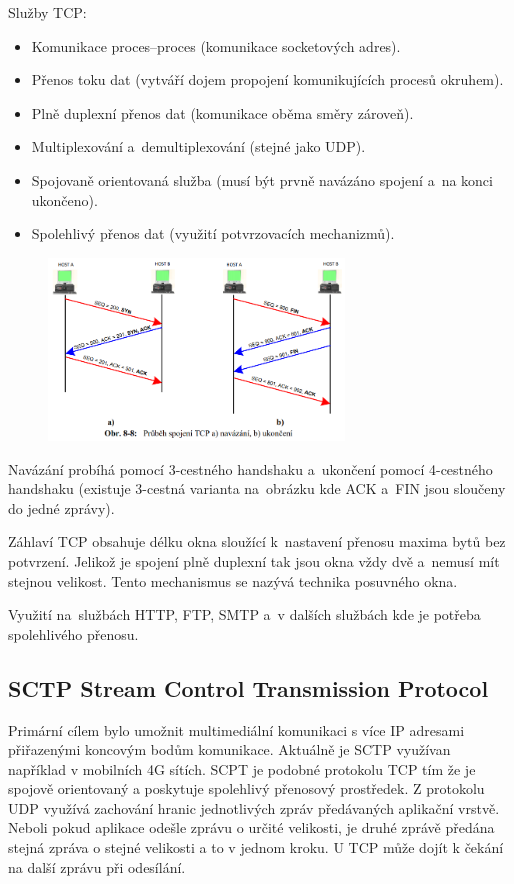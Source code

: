 Služby TCP:
\begin{itemize}[noitemsep]
    \item Komunikace proces--proces (komunikace socketových adres).
    \item Přenos toku dat (vytváří dojem propojení komunikujících procesů okruhem).
    \item Plně duplexní přenos dat (komunikace oběma směry zároveň).
    \item Multiplexování a~demultiplexování (stejné jako UDP).
    \item Spojovaně orientovaná služba (musí být prvně navázáno spojení a~na konci ukončeno).
    \item Spolehlivý přenos dat (využití potvrzovacích mechanizmů).
\end{itemize}

\begin{figure}[!h]
    \centering
    \includegraphics[width=0.7\textwidth]{obrazky/032.png}
\end{figure}

Navázání probíhá pomocí 3-cestného handshaku a~ukončení pomocí 4-cestného handshaku (existuje 3-cestná varianta na~obrázku kde ACK a~FIN jsou sloučeny do jedné zprávy).

Záhlaví TCP obsahuje délku okna sloužící k~nastavení přenosu maxima bytů bez potvrzení. Jelikož je spojení plně duplexní tak jsou okna vždy dvě a~nemusí mít stejnou velikost. Tento mechanismus se nazývá technika posuvného okna.

Využití na~službách HTTP, FTP, SMTP a~v dalších službách kde je potřeba spolehlivého přenosu.

\subsection{SCTP Stream Control Transmission Protocol}

Primární cílem bylo umožnit multimediální komunikaci s více IP adresami přiřazenými koncovým bodům komunikace.
Aktuálně je SCTP využívan například v mobilních 4G sítích.
SCPT je podobné protokolu TCP tím že je spojově orientovaný a poskytuje spolehlivý přenosový prostředek.
Z protokolu UDP využívá zachování hranic jednotlivých zpráv předávaných aplikační vrstvě.
Neboli pokud aplikace odešle zprávu o určité velikosti, je druhé zprávě předána stejná zpráva o stejné velikosti a to v jednom kroku.
U TCP může dojít k čekání na další zprávu při odesílání.

